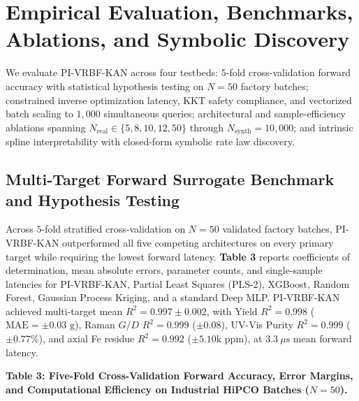 \documentclass[10pt,journal,onecolumn]{IEEEtran}
\begin{document}
\section{Empirical Evaluation, Benchmarks, Ablations, and Symbolic Discovery}
We evaluate PI-VRBF-KAN across four testbeds: $5$-fold cross-validation forward accuracy with statistical hypothesis testing on $N = 50$ factory batches; constrained inverse optimization latency, KKT safety compliance, and vectorized batch scaling to $1,000$ simultaneous queries; architectural and sample-efficiency ablations spanning $N_{\text{real}} \in \{5, 8, 10, 12, 50\}$ through $N_{\text{synth}} = 10,000$; and intrinsic spline interpretability with closed-form symbolic rate law discovery.

\subsection{Multi-Target Forward Surrogate Benchmark and Hypothesis Testing}
Across $5$-fold stratified cross-validation on $N = 50$ validated factory batches, PI-VRBF-KAN outperformed all five competing architectures on every primary target while requiring the lowest forward latency. \textbf{Table 3} reports coefficients of determination, mean absolute errors, parameter counts, and single-sample latencies for PI-VRBF-KAN, Partial Least Squares (PLS-2), XGBoost, Random Forest, Gaussian Process Kriging, and a standard Deep MLP. PI-VRBF-KAN achieved multi-target mean $R^2 = 0.997 \pm 0.002$, with Yield $R^2 = 0.998$ ($\text{MAE} = \pm 0.03\text{ g}$), Raman $G/D$ $R^2 = 0.999$ ($\pm 0.08$), UV-Vis Purity $R^2 = 0.999$ ($\pm 0.77\%$), and axial Fe residue $R^2 = 0.992$ ($\pm 5.10\text{k ppm}$), at $3.3\ \mu\text{s}$ mean forward latency.

\textbf{Table 3: Five-Fold Cross-Validation Forward Accuracy, Error Margins, and Computational Efficiency on Industrial HiPCO Batches ($N = 50$).}
\end{document}

